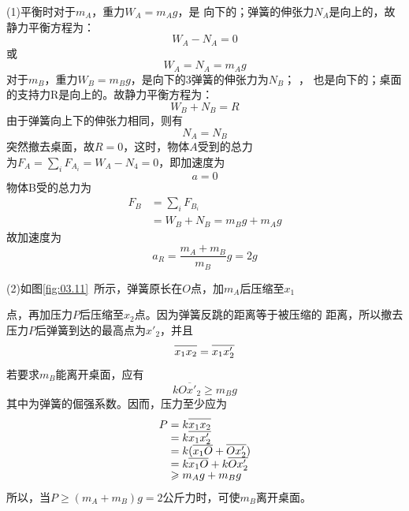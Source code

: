 \solution (1)平衡时对于$ m_A $，重力$ W _ { A } = m _ { A } g $，是
向下的；弹簧的伸张力$ N _ { A } $是向上的，故静力平衡方程为：\vspace{-0.5em}
\begin{equation*}
	W _ { A } - N _ { A } = 0
\end{equation*}
或\vspace{-1.56em}
\begin{equation*}
	W _ { A } = N _ { A } = m _ { A } g
\end{equation*}
对于$ m_B $，重力$ W _ { B } = m _ { B } g $，是向下的3弹簧的伸张力为$ N _ { B } $； ，
也是向下的；桌面的支持力R是向上的。故静力平衡方程为：
\begin{equation*}
	W _ { B } + N _ { B } = R
\end{equation*}
由于弹簧向上下的伸张力相同，则有
\begin{equation*}
	N _ { A } = N _ { B }
\end{equation*}
突然撤去桌面，故$  R = 0  $，这时，物体$ A $受到的总力$ 为 F _ { A } =
\sum _ i F _ { A _ i } = W _ { A } - N _ { 4 } = 0  $，即加速度为
\begin{equation*}
	a = 0
\end{equation*}
物体B受的总力为
\begin{align*}
	F _ { B } &= \sum _ i F _ { B _ i } \\
		&= W _ { B } + N _ { B } = m _ { B } g + m _ { A } g
\end{align*}
故加速度为
\begin{equation*}
	a _ { R } = \frac { m _ { A } + m _ { B } } { m _ { B } } g = 2 g
\end{equation*}

(2)如图\ref{fig:03.11}~所示，弹簧原长在$ O $点，加$ m_{A} $后压缩至$ x_{1} $

\noindent 点，再加压力$ P $后压缩至$ x_{2} $点。因为弹簧反跳的距离等于被压缩的
距离，所以撤去压力$ P $后弹簧到达的最高点为$  x'_ { 2 }  $，并且
\begin{equation*}
	\overline{ x _ { 1 } x _ { 2 } \llap{\phantom{'}} } = \overline{ x _ { 1 } x' _ { 2 }}
\end{equation*}
若要求$ m_B $能离开桌面，应有
\begin{equation*}
	k \overline{ O x' _ { 2 } } \geqslant m _ { B } g
\end{equation*}
其中为弹簧的倔强系数。因而，压力至少应为
\begin{align*}
	P &= k \overline{ x _ { 1 } x _ { 2 } \llap{\phantom{'}}} \\[-0.5em]
	  &= k \overline{ x _ { 1 } x ' _ { 2 } } \\[-0.5em]
	  &= k ( \overline{ x _ { 1 } O \llap{\phantom{'}} } + \overline{ O x ' _ { 2 } } ) \\[-0.5em]
	  &= k \overline { x _ { 1 } O \llap{\phantom{'}}} + k \overline { O x '_2} \\[-0.5em]
	  &\geqslant m _ { A } g + m _ { B } g
\end{align*}
所以，当$  P \geqslant ( m _ { A } + m _ { B } ) g = 2 \text{公斤力} $时，可使$ m_{B} $离开桌面。

